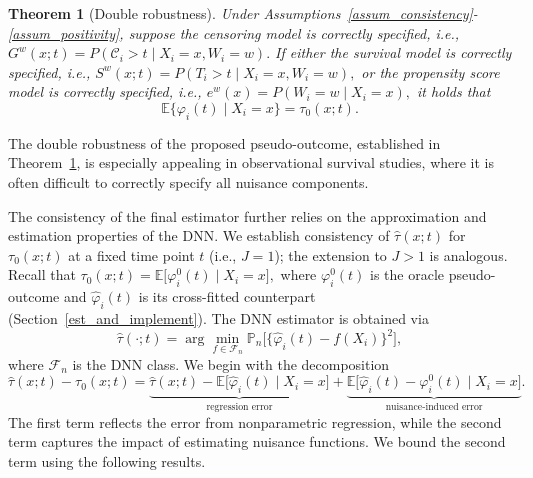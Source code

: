 \documentclass{article}
\newtheorem{theorem}{Theorem}
\begin{document}
\begin{theorem}[Double robustness]\label{thm:DR}
Under Assumptions~\ref{assum_consistency}-\ref{assum_positivity}, suppose the censoring model is correctly specified, i.e.,
\(
G^w(x;t)=P(\mathcal C_i>t\mid X_i=x,W_i=w).
\)
If either
 the survival model is correctly specified, i.e.,
\(
S^w(x;t)=P(T_i>t\mid X_i=x,W_i=w),
\)
or
 the propensity score model is correctly specified, i.e.,
\(
e^w(x)=P(W_i=w\mid X_i=x),
\)
it holds that
\[
\mathbb E\{\varphi_i(t)\mid X_i=x\}=\tau_0(x;t).
\]
\end{theorem}

 
 The double robustness of the proposed pseudo-outcome, established in Theorem~\ref{thm:DR}, is especially appealing in observational survival studies, where it is often difficult to correctly specify all nuisance components. 
 
 
 The consistency of the final estimator further relies on the approximation and estimation properties of the DNN.
We establish consistency of $\hat{\tau}(x;t)$ for $\tau_0(x;t)$ at a fixed time point $t$ (i.e., $J=1$); the extension to $J>1$ is analogous. Recall that
\(
\tau_0(x;t)
=
\mathbb{E}\big[\varphi_i^0(t)\mid X_i = x\big],
\)
where $\varphi_i^0(t)$ is the oracle pseudo-outcome and $\hat{\varphi}_i(t)$ is its cross-fitted counterpart (Section~\ref{est_and_implement}). The DNN estimator is obtained via
\[
\hat\tau(\cdot;t) = \arg\min_{f\in\mathcal F_n}
\mathbb P_n\big[\{\hat\varphi_i(t)-f(X_i)\}^2\big],
\]
where $\mathcal F_n$ is the DNN class. 
We begin with the decomposition
\[
\hat{\tau}(x;t) - \tau_0(x;t)
=
\underbrace{\hat{\tau}(x;t) - \mathbb{E}\big[\hat{\varphi}_i(t)\mid X_i = x\big]}_{\text{regression error}}
+
\underbrace{\mathbb{E}\big[\hat{\varphi}_i(t) - \varphi_i^0(t)\mid X_i = x\big]}_{\text{nuisance-induced error}}.
\]
The first term reflects the error from nonparametric regression, while the second term captures the impact of estimating nuisance functions. We bound the second term using the following results. 
\end{document}
